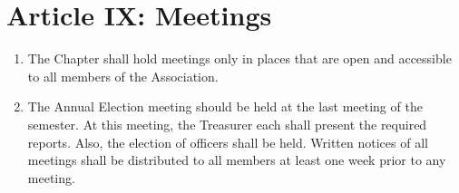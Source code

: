 \section*{Article IX: Meetings}

\begin{enumerate}
    \item The Chapter shall hold meetings only in places that are open and accessible to all members of the Association.
    \item The Annual Election meeting should be held at the last meeting of the semester.
    At this meeting, the Treasurer each shall present the required reports.
    Also, the election of officers shall be held.
    Written notices of all meetings shall be distributed to all members at least one week prior to any meeting.
\end{enumerate}
